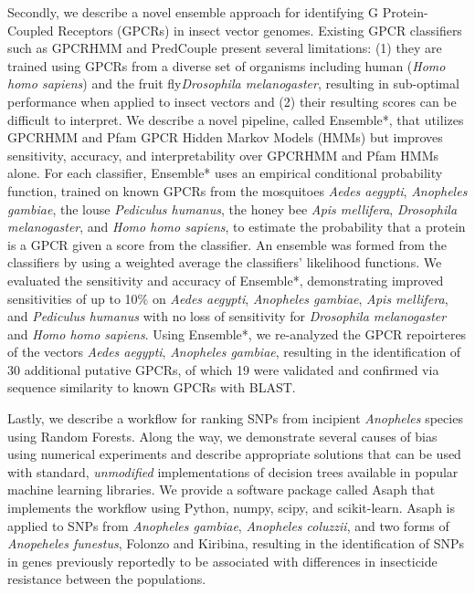 Secondly, we describe a novel ensemble approach for identifying G Protein-Coupled Receptors (GPCRs) in insect vector genomes.  Existing GPCR classifiers such as GPCRHMM and PredCouple present several limitations: (1) they are trained using GPCRs from a diverse set of organisms including human (\emph{Homo homo sapiens}) and the fruit fly\emph{Drosophila melanogaster}, resulting in sub-optimal performance when applied to insect vectors and (2) their resulting scores can be difficult to interpret.  We describe a novel pipeline, called Ensemble*, that utilizes GPCRHMM and Pfam GPCR Hidden Markov Models (HMMs) but improves sensitivity, accuracy, and interpretability over GPCRHMM and Pfam HMMs alone. For each classifier, Ensemble* uses an empirical conditional probability function, trained on known GPCRs from the mosquitoes \emph{Aedes aegypti}, \emph{Anopheles gambiae}, the louse \emph {Pediculus humanus}, the honey bee \emph{Apis mellifera}, \emph{Drosophila melanogaster}, and \emph{Homo homo sapiens}, to estimate the probability that a protein is a GPCR given a score from the classifier.  An ensemble was formed from the classifiers by using a weighted average the classifiers' likelihood functions.  We evaluated the sensitivity and accuracy of Ensemble*, demonstrating improved sensitivities of up to 10\% on \emph{Aedes aegypti}, \emph{Anopheles gambiae}, \emph{Apis mellifera}, and \emph{Pediculus humanus} with no loss of sensitivity for \emph{Drosophila melanogaster} and \emph{Homo homo sapiens}. Using Ensemble*, we re-analyzed the GPCR repoirteres of the vectors \emph{Aedes aegypti}, \emph{Anopheles gambiae}, resulting in the identification of 30 additional putative GPCRs, of which 19 were validated and confirmed via sequence similarity to known GPCRs with BLAST.

Lastly, we describe a workflow for ranking SNPs from incipient \emph{Anopheles} species using Random Forests.  Along the way, we demonstrate several causes of bias using numerical experiments and describe appropriate solutions that can be used with standard, \emph{unmodified} implementations of decision trees available in popular machine learning libraries. We provide a software package called Asaph that implements the workflow using Python, numpy, scipy, and scikit-learn.  Asaph is applied to SNPs from \emph{Anopheles gambiae}, \emph{Anopheles coluzzii}, and two forms of \emph{Anopeheles funestus}, Folonzo and Kiribina, resulting in the identification of SNPs in genes previously reportedly to be associated with differences in insecticide resistance between the populations.

